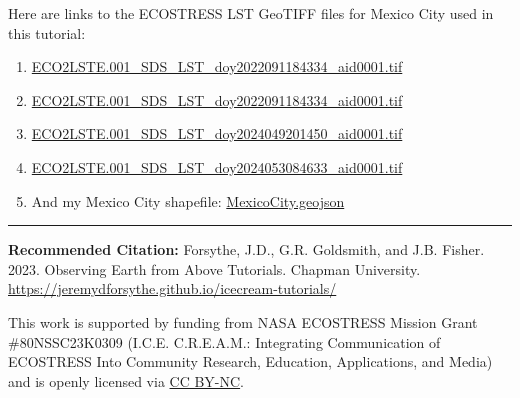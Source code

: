 \documentclass[oneside,a4paper,11pt,explicit]{book}
\begin{document}
\begin{tcolorbox}[colback=yellow!5!white,title=\textbf{Datafiles}]
	\large
	Here are links to the ECOSTRESS LST GeoTIFF files for Mexico City used in this tutorial:

    \begin{enumerate}
        \item \href{https://jeremydforsythe.github.io/icecream-tutorials/Tutorial11_RasterCalculator/ECO2LSTE.001_SDS_LST_doy2022091184334_aid0001.tif}{\small ECO2LSTE.001\_SDS\_LST\_doy2022091184334\_aid0001.tif}
        \item \href{https://jeremydforsythe.github.io/icecream-tutorials/Tutorial11_RasterCalculator/ECO2LSTE.001_SDS_LST_doy2022091184334_aid0001.tif}{\small ECO2LSTE.001\_SDS\_LST\_doy2022091184334\_aid0001.tif}
        \item \href{https://jeremydforsythe.github.io/icecream-tutorials/Tutorial11_RasterCalculator/ECO2LSTE.001_SDS_LST_doy2024049201450_aid0001.tif}{\small ECO2LSTE.001\_SDS\_LST\_doy2024049201450\_aid0001.tif}
        \item \href{https://jeremydforsythe.github.io/icecream-tutorials/Tutorial11_RasterCalculator/ECO2LSTE.001_SDS_LST_doy2024053084633_aid0001.tif}{\small ECO2LSTE.001\_SDS\_LST\_doy2024053084633\_aid0001.tif}
        \item And my Mexico City shapefile: \href{https://jeremydforsythe.github.io/icecream-tutorials/Tutorial10_ESI/MexicoCityPolygon/MexicoCity.geojson}{\small MexicoCity.geojson}
    \end{enumerate}
\end{tcolorbox}

\vfill

\hrule

\vspace{1em}

\small \textbf{Recommended Citation:} Forsythe, J.D., G.R. Goldsmith, and J.B. Fisher. 2023. Observing Earth from Above Tutorials. Chapman University. \url{https://jeremydforsythe.github.io/icecream-tutorials/}

\vspace{1em}

This work is supported by funding from NASA ECOSTRESS Mission Grant \#80NSSC23K0309 (I.C.E. C.R.E.A.M.: Integrating Communication of ECOSTRESS Into Community Research, Education, Applications, and Media) and is openly licensed via \href{https://creativecommons.org/licenses/by-nc/4.0/}{CC BY-NC}.
\end{document}
